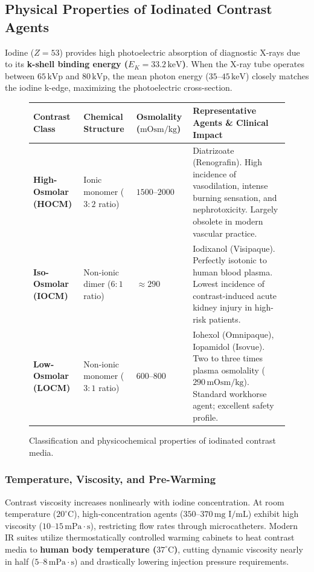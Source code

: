 \documentclass[11pt,a4paper]{article}
\begin{document}
\subsection{Physical Properties of Iodinated Contrast Agents}

Iodine ($Z = 53$) provides high photoelectric absorption of diagnostic X-rays due to its \textbf{k-shell binding energy ($E_K = 33.2\,\text{keV}$)}. When the X-ray tube operates between $65\,\text{kVp}$ and $80\,\text{kVp}$, the mean photon energy ($35\text{--}45\,\text{keV}$) closely matches the iodine k-edge, maximizing the photoelectric cross-section.

\begin{figure}[htbp]
\centering
\setlength{\tabcolsep}{4pt}
\begin{tabular}{p{3.8cm}p{2.8cm}p{2.6cm}p{5.2cm}}
\toprule
\textbf{Contrast Class} & \textbf{Chemical Structure} & \textbf{Osmolality ($\text{mOsm/kg}$)} & \textbf{Representative Agents \& Clinical Impact} \\
\midrule
\textbf{High-Osmolar (HOCM)} & Ionic monomer ($3:2$ ratio) & $1500\text{--}2000$ & Diatrizoate (Renografin). High incidence of vasodilation, intense burning sensation, and nephrotoxicity. Largely obsolete in modern vascular practice. \\
\addlinespace
\textbf{Iso-Osmolar (IOCM)} & Non-ionic dimer ($6:1$ ratio) & $\approx 290$ & Iodixanol (Visipaque). Perfectly isotonic to human blood plasma. Lowest incidence of contrast-induced acute kidney injury in high-risk patients. \\
\addlinespace
\textbf{Low-Osmolar (LOCM)} & Non-ionic monomer ($3:1$ ratio) & $600\text{--}800$ & Iohexol (Omnipaque), Iopamidol (Isovue). Two to three times plasma osmolality ($290\,\text{mOsm/kg}$). Standard workhorse agent; excellent safety profile. \\
\bottomrule
\end{tabular}
\caption{Classification and physicochemical properties of iodinated contrast media.}
\label{tab:contrast_classes}
\end{figure}

\subsubsection{Temperature, Viscosity, and Pre-Warming}
Contrast viscosity increases nonlinearly with iodine concentration. At room temperature ($20^\circ\text{C}$), high-concentration agents ($350\text{--}370\,\text{mg I/mL}$) exhibit high viscosity ($10\text{--}15\,\text{mPa}\cdot\text{s}$), restricting flow rates through microcatheters. Modern IR suites utilize thermostatically controlled warming cabinets to heat contrast media to \textbf{human body temperature ($37^\circ\text{C}$)}, cutting dynamic viscosity nearly in half ($5\text{--}8\,\text{mPa}\cdot\text{s}$) and drastically lowering injection pressure requirements.
\end{document}
